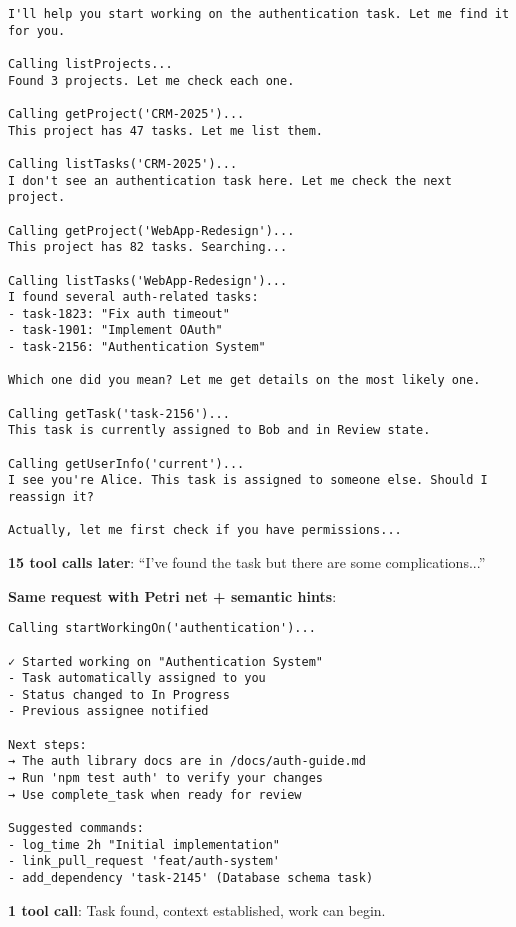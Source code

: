 \documentclass[11pt,a4paper]{article}
\begin{document}
\begin{lstlisting}[language={}]
I'll help you start working on the authentication task. Let me find it for you.

Calling listProjects...
Found 3 projects. Let me check each one.

Calling getProject('CRM-2025')...
This project has 47 tasks. Let me list them.

Calling listTasks('CRM-2025')...
I don't see an authentication task here. Let me check the next project.

Calling getProject('WebApp-Redesign')...
This project has 82 tasks. Searching...

Calling listTasks('WebApp-Redesign')...
I found several auth-related tasks:
- task-1823: "Fix auth timeout"
- task-1901: "Implement OAuth"
- task-2156: "Authentication System"

Which one did you mean? Let me get details on the most likely one.

Calling getTask('task-2156')...
This task is currently assigned to Bob and in Review state. 

Calling getUserInfo('current')...
I see you're Alice. This task is assigned to someone else. Should I reassign it?

Actually, let me first check if you have permissions...
\end{lstlisting}

\textbf{15 tool calls later}: ``I've found the task but there are some complications...''

\hrulefill

\textbf{Same request with Petri net + semantic hints}:

\begin{lstlisting}[language={}]
Calling startWorkingOn('authentication')...

✓ Started working on "Authentication System"
- Task automatically assigned to you
- Status changed to In Progress
- Previous assignee notified

Next steps:
→ The auth library docs are in /docs/auth-guide.md
→ Run 'npm test auth' to verify your changes
→ Use complete_task when ready for review

Suggested commands:
- log_time 2h "Initial implementation"
- link_pull_request 'feat/auth-system'
- add_dependency 'task-2145' (Database schema task)
\end{lstlisting}

\textbf{1 tool call}: Task found, context established, work can begin.
\end{document}
